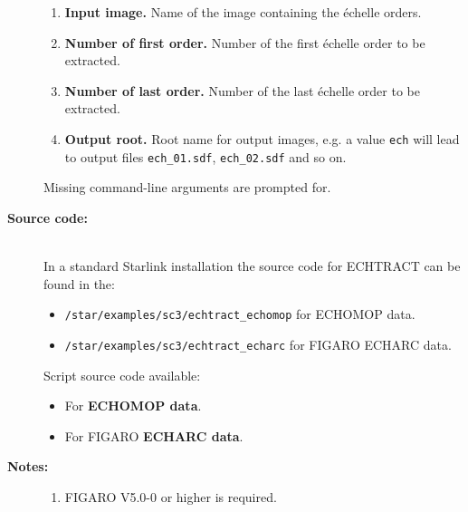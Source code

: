 \documentclass[twoside,11pt]{article}
\newenvironment{latexonly}{}{}
\newcommand{\htmlref}[2]{#1}
\newcommand{\xref}[3]{#1}
\begin{document}
\begin{description}
\begin{enumerate}
\item {\bf Input image.}
      Name of the image containing the \'{e}chelle orders.

\item {\bf Number of first order.}
      Number of the first \'{e}chelle order to be extracted.

\item {\bf Number of last order.}
      Number of the last \'{e}chelle order to be extracted.

\item {\bf Output root.}
      Root name for output images, e.g. a value \verb+ech+ will
      lead to output files \verb+ech_01.sdf+, \verb+ech_02.sdf+
      and so on.

\end{enumerate}

     Missing command-line arguments are prompted for.

\item [{\bf Source code:}] \mbox{} \\
\begin{latexonly}
In a standard Starlink installation the source code for ECHTRACT can be found
in the:
\begin{itemize}

\item {\tt /star/examples/sc3/echtract\_echomop} for ECHOMOP data.

\item {\tt /star/examples/sc3/echtract\_echarc} for FIGARO ECHARC data.

\end{itemize}
\end{latexonly}
\begin{htmlonly}
      Script source code available:
\begin{itemize}

\item For \htmlref{{\bf ECHOMOP data}}{se_echtract_echomop_source}.

\item For FIGARO \htmlref{{\bf ECHARC data}}{se_echtract_echarc_source}.

\end{itemize}
\end{htmlonly}

\item [{\bf Notes:}] \mbox{}
\begin{enumerate}
\item \xref{FIGARO}{sun86}{} V5.0-0 or higher is required.


\end{enumerate}
\end{description}
\end{document}
